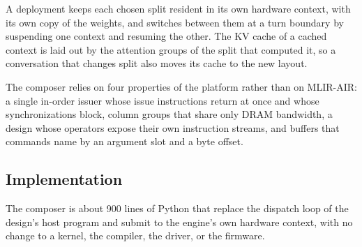 A deployment keeps each chosen split resident in its own hardware context, with its own copy of the weights, and switches between them at a turn boundary by suspending one context and resuming the other.
The KV cache of a cached context is laid out by the attention groups of the split that computed it, so a conversation that changes split also moves its cache to the new layout.

The composer relies on four properties of the platform rather than on MLIR-AIR: a single in-order issuer whose issue instructions return at once and whose synchronizations block, column groups that share only DRAM bandwidth, a design whose operators expose their own instruction streams, and buffers that commands name by an argument slot and a byte offset.

\subsection{Implementation}
\label{subsec:impl}

The composer is about 900 lines of Python that replace the dispatch loop of the design's host program and submit to the engine's own hardware context, with no change to a kernel, the compiler, the driver, or the firmware.

